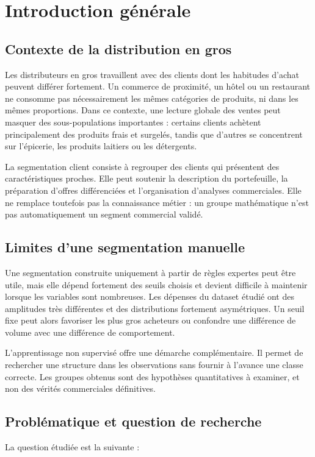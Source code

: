 \chapter{Introduction générale}

\section{Contexte de la distribution en gros}
Les distributeurs en gros travaillent avec des clients dont les habitudes d'achat peuvent différer fortement. Un commerce de proximité, un hôtel ou un restaurant ne consomme pas nécessairement les mêmes catégories de produits, ni dans les mêmes proportions. Dans ce contexte, une lecture globale des ventes peut masquer des sous-populations importantes : certains clients achètent principalement des produits frais et surgelés, tandis que d'autres se concentrent sur l'épicerie, les produits laitiers ou les détergents.

La segmentation client consiste à regrouper des clients qui présentent des caractéristiques proches. Elle peut soutenir la description du portefeuille, la préparation d'offres différenciées et l'organisation d'analyses commerciales. Elle ne remplace toutefois pas la connaissance métier : un groupe mathématique n'est pas automatiquement un segment commercial validé.

\section{Limites d'une segmentation manuelle}
Une segmentation construite uniquement à partir de règles expertes peut être utile, mais elle dépend fortement des seuils choisis et devient difficile à maintenir lorsque les variables sont nombreuses. Les dépenses du dataset étudié ont des amplitudes très différentes et des distributions fortement asymétriques. Un seuil fixe peut alors favoriser les plus gros acheteurs ou confondre une différence de volume avec une différence de comportement.

L'apprentissage non supervisé offre une démarche complémentaire. Il permet de rechercher une structure dans les observations sans fournir à l'avance une classe correcte. Les groupes obtenus sont des hypothèses quantitatives à examiner, et non des vérités commerciales définitives.

\section{Problématique et question de recherche}
La question étudiée est la suivante :

